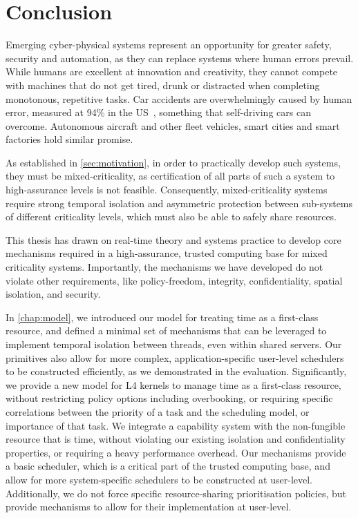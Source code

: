 \chapter{Conclusion}
\label{chap:conclusion}

Emerging cyber-physical systems represent an opportunity for greater safety, security and 
automation, as they can replace systems where human errors prevail. While humans are excellent at
innovation and creativity, they cannot compete with machines that do not get tired, drunk or
distracted when completing
monotonous, repetitive tasks. Car accidents are overwhelmingly 
caused by human error, measured at 94\% in the US~\citep{Singh_15}, something that self-driving cars can overcome. Autonomous aircraft and other fleet vehicles, smart cities and smart factories hold similar promise. 

As established in \cref{sec:motivation}, in order to practically develop such systems,
they must be mixed-criticality, as certification of all parts of such a system to high-assurance
levels is not feasible. Consequently, mixed-criticality systems require strong temporal isolation
and asymmetric protection between sub-systems of different criticality levels, 
which must also be able to safely share resources.

This thesis has drawn on real-time theory and systems practice to develop core mechanisms required
in a high-assurance, trusted computing base for mixed criticality systems. Importantly, the
mechanisms we have developed do not violate other requirements, like policy-freedom, integrity,
confidentiality, spatial isolation, and security. 

In \cref{chap:model}, we introduced our model for treating time as a first-class resource, and 
defined a minimal set of
mechanisms that can be leveraged to implement temporal isolation between threads, even within shared
servers. Our primitives also allow for more complex, application-specific user-level schedulers to
be constructed efficiently, as we demonstrated in the evaluation. Significantly, we provide a
new model for L4 kernels to manage time as a first-class resource, without restricting policy
options including overbooking, 
or requiring specific correlations between the priority of a task and the scheduling model, or
importance of that task. 
We integrate a capability system with the non-fungible resource that is time, without violating our
existing isolation and confidentiality properties, or requiring a heavy performance overhead.
Our mechanisms provide a basic scheduler, which is a critical part of the
trusted computing base, and allow for more system-specific schedulers to be constructed at
user-level. Additionally, we do not force specific
resource-sharing prioritisation policies, but provide mechanisms to allow for their implementation at user-level. 
\clearpage


